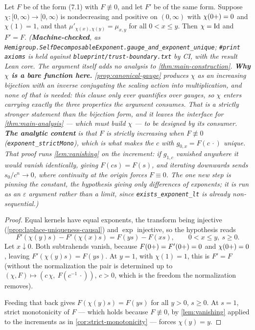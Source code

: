 \begin{proposition}\label{prop:main-uniqueness}
\leanok
Let $F$ be of the form (7.1) with $F \not\equiv 0$, and let $F'$ be of the same form. Suppose
$\chi : [0,\infty) \to [0,\infty)$ is nondecreasing and positive on $(0,\infty)$ with
$\chi(0{+}) = 0$ and $\chi(1) = 1$, and that $\mu'_{\chi(x),\chi(y)} = \mu_{x,y}$ for all
$0 < x \le y$. Then $\chi = \mathrm{Id}$ and $F' = F$.
\statusT\quad\emph{(\textbf{Machine-checked}, as
\texttt{Hemigroup.SelfDecomposableExponent.gauge\_and\_exponent\_unique};
\texttt{\#print axioms} is held against \texttt{blueprint/trust-boundary.txt} by CI, with
the result Lean core. The argument itself adds no analysis to
\ref{thm:main-construction}.
\textbf{Why $\chi$ is a bare function here.} \ref{prop:canonical-gauge} produces $\chi$ as an
increasing bijection with an inverse conjugating the scaling action into multiplication, and
none of that is needed: this clause only ever \emph{quantifies over} gauges, so $\chi$ enters
carrying exactly the three properties the argument consumes. That is a strictly stronger
statement than the bijection form, and it leaves the interface for
\ref{thm:main-analysis} --- which must \emph{build} $\chi$ --- to be designed by its consumer.
\textbf{The analytic content} is that $F$ is strictly increasing when $F \not\equiv 0$
(\texttt{exponent\_strictMono}), which is what makes the $c$ with $g_{0,x} = F(c\,\cdot)$
unique. That proof runs \ref{lem:vanishing} on the \emph{increment}: if $g_{1,c}$ vanished
anywhere it would vanish identically, giving $F(cs) = F(s)$, and iterating \emph{downwards}
sends $s_0/c^n \to 0$, where continuity at the origin forces $F \equiv 0$. The one new step is
pinning the constant, the hypothesis giving only \emph{differences} of exponents; it is run as
an $\varepsilon$ argument rather than a limit, since \texttt{exists\_exponent\_lt} is already
non-sequential.)}
\end{proposition}

\begin{proof}
\leanok
Equal kernels have equal exponents, the transform being injective
(\ref{prop:laplace-uniqueness-causal}) and $\exp$ injective, so the hypothesis reads
\[
  F'(\chi(y)s) - F'(\chi(x)s) = F(ys) - F(xs), \qquad 0 < x \le y,\ s \ge 0 .
\]
Let $x \downarrow 0$. Both subtrahends vanish, because $F(0{+}) = F'(0{+}) = 0$ and
$\chi(0{+}) = 0$, leaving $F'(\chi(y)s) = F(ys)$. At $y = 1$, with $\chi(1) = 1$, this is
$F' = F$ (without the normalization the pair is determined up to
$(\chi, F) \mapsto (c\,\chi,\ F(c^{-1}\,\cdot))$, $c > 0$, which is the freedom the
normalization removes).

Feeding that back gives $F(\chi(y)s) = F(ys)$ for all $y > 0$, $s \ge 0$. At $s = 1$, strict
monotonicity of $F$ --- which holds because $F \not\equiv 0$, by \ref{lem:vanishing} applied to
the increments as in \ref{cor:strict-monotonicity} --- forces $\chi(y) = y$.
\end{proof}

